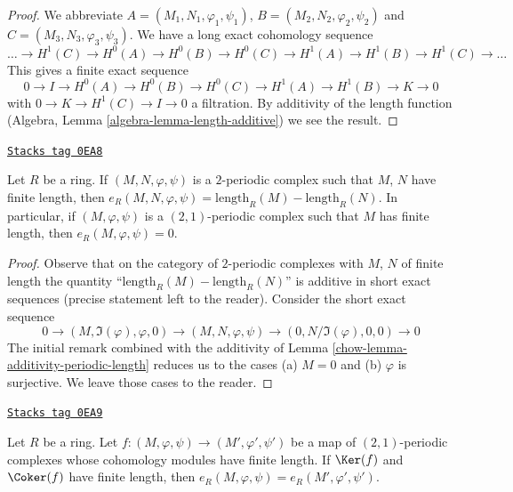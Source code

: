 \begin{proof}
We abbreviate $A = (M_1, N_1, \varphi_1, \psi_1)$,
$B = (M_2, N_2, \varphi_2, \psi_2)$ and $C = (M_3, N_3, \varphi_3, \psi_3)$.
We have a long exact cohomology sequence
$$
\ldots
\to H^1(C)
\to H^0(A)
\to H^0(B)
\to H^0(C)
\to H^1(A)
\to H^1(B)
\to H^1(C)
\to \ldots
$$
This gives a finite exact sequence
$$
0 \to I
\to H^0(A)
\to H^0(B)
\to H^0(C)
\to H^1(A)
\to H^1(B)
\to K \to 0
$$
with $0 \to K \to H^1(C) \to I \to 0$ a filtration. By additivity of
the length function (Algebra, Lemma \ref{algebra-lemma-length-additive})
we see the result.
\end{proof}

\begin{lemma}
\label{chow-lemma-finite-periodic-length}
\href{https://stacks.math.columbia.edu/tag/0EA8}{\texttt{Stacks tag 0EA8}}

Let $R$ be a ring. If $(M, N, \varphi, \psi)$ is a $2$-periodic complex
such that $M$, $N$ have finite length, then
$e_R(M, N, \varphi, \psi) = \text{length}_R(M) - \text{length}_R(N)$.
In particular, if $(M, \varphi, \psi)$ is a $(2, 1)$-periodic complex
such that $M$ has finite length, then
$e_R(M, \varphi, \psi) = 0$.
\end{lemma}

\begin{proof}

Observe that on the category of $2$-periodic complexes with $M$, $N$
of finite length the quantity ``$\text{length}_R(M) - \text{length}_R(N)$''
is additive in short exact sequences (precise statement left to the reader).
Consider the short exact sequence
$$
0 \to (M, \Im(\varphi), \varphi, 0) \to
(M, N, \varphi, \psi) \to (0, N/\Im(\varphi), 0, 0) \to 0
$$
The initial remark combined with the additivity of
Lemma \ref{chow-lemma-additivity-periodic-length}
reduces us to the cases (a) $M = 0$ and (b) $\varphi$ is surjective.
We leave those cases to the reader.
\end{proof}

\begin{lemma}
\label{chow-lemma-compare-periodic-lengths}
\href{https://stacks.math.columbia.edu/tag/0EA9}{\texttt{Stacks tag 0EA9}}

Let $R$ be a ring. Let $f : (M, \varphi, \psi) \to (M', \varphi', \psi')$
be a map of $(2, 1)$-periodic complexes whose cohomology modules
have finite length. If $\Ker(f)$ and $\Coker(f)$ have finite length,
then $e_R(M, \varphi, \psi) = e_R(M', \varphi', \psi')$.
\end{lemma}

